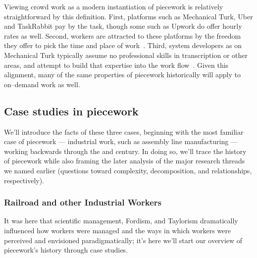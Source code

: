 \documentclass[trackingWork]{subfiles}
\begin{document}
Viewing crowd work as a modern instantiation of piecework is relatively straightforward by this definition.
First, platforms such as Mechanical Turk, Uber and TaskRabbit pay by the task, though some such as Upwork do offer hourly rates as well.
Second, workers are attracted to these platforms by the freedom they offer to pick the time and place of work~\cite{martin2014being,whyWouldAnyoneBrewer}.
Third, system developers as on Mechanical Turk typically assume no professional skills in transcription or other areas, and attempt to build that expertise into the work flow~\cite{noronha2011platemate,bernsteinSoylent}.
Given this alignment, many of the same properties of piecework historically will apply to on--demand work as well. 



\subsection{Case studies in piecework}
We'll introduce the facts of these three cases,
beginning with the most familiar case of piecework
--- industrial work, such as assembly line manufacturing ---
working backwards through the  and  century.
In doing so, we'll trace the history of piecework
while also framing the later analysis of the major research threads we named earlier
(questions toward complexity, decomposition, and relationships, respectively).





\subsubsection{Railroad and other Industrial Workers}
It was here that
scientific management, Fordism, and Taylorism
dramatically influenced how workers were managed and
the ways in which workers were perceived and envisioned paradigmatically;
it's here we'll start our overview of piecework's history through case studies. 
\end{document}
